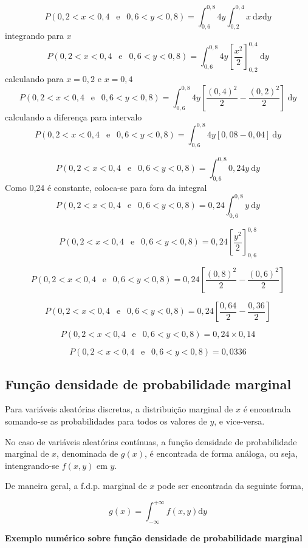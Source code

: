 \documentclass[
]{book}
\begin{document}
\[
  P(0,2 < x < 0,4~~\text{ e }~~0,6 < y < 0,8) = \int_{0,6}^{0,8}4y\int_{0,2}^{0,4}x~\text{d}x \text{d}y
\]
integrando para \(x\)
\[
  P(0,2 < x < 0,4~~\text{ e }~~0,6 < y < 0,8) = \int_{0,6}^{0,8}4y\left[\dfrac{x^2}{2} \right]_{0,2}^{0,4}~\text{d}y
\]
calculando para \(x=0,2\) e \(x=0,4\)
\[
  P(0,2 < x < 0,4~~\text{ e }~~0,6 < y < 0,8) = \int_{0,6}^{0,8}4y\left[\dfrac{(0,4)^2}{2} - \dfrac{(0,2)^2}{2} \right]~\text{d}y
\]
calculando a diferença para intervalo
\[
  P(0,2 < x < 0,4~~\text{ e }~~0,6 < y < 0,8) = \int_{0,6}^{0,8}4y\left[0,08 - 0,04 \right]~\text{d}y
\]

\[
  P(0,2 < x < 0,4~~\text{ e }~~0,6 < y < 0,8) = \int_{0,6}^{0,8}0,24y~\text{d}y
\]
Como 0,24 é constante, coloca-se para fora da integral
\[
  P(0,2 < x < 0,4~~\text{ e }~~0,6 < y < 0,8) = 0,24\int_{0,6}^{0,8}y~\text{d}y
\]

\[
  P(0,2 < x < 0,4~~\text{ e }~~0,6 < y < 0,8) = 0,24\left[  \dfrac{y^2}{2}\right]_{0,6}^{0,8}
\]

\[
  P(0,2 < x < 0,4~~\text{ e }~~0,6 < y < 0,8) = 0,24\left[  \dfrac{(0,8)^2}{2} - \dfrac{(0,6)^2}{2}\right]
\]

\[
  P(0,2 < x < 0,4~~\text{ e }~~0,6 < y < 0,8) = 0,24\left[  \dfrac{0,64}{2} - \dfrac{0,36}{2}\right]
\]

\[
  P(0,2 < x < 0,4~~\text{ e }~~0,6 < y < 0,8) = 0,24\times 0,14
\]

\[
  P(0,2 < x < 0,4~~\text{ e }~~0,6 < y < 0,8) = 0,0336
\]

\hypertarget{funuxe7uxe3o-densidade-de-probabilidade-marginal}{%
\subsection{Função densidade de probabilidade marginal}\label{funuxe7uxe3o-densidade-de-probabilidade-marginal}}

Para variáveis aleatórias discretas, a distribuição marginal de \(x\) é encontrada somando-se as probabilidades para todos os valores de \(y\), e vice-versa.

No caso de variáveis aleatórias contínuas, a função densidade de probabilidade marginal de \(x\), denominada de \(g(x)\), é encontrada de forma análoga, ou seja, intengrando-se \(f(x,y)\) em \(y\).

De maneira geral, a f.d.p. marginal de \(x\) pode ser encontrada da seguinte forma,

\[
  g(x) = \int_{-\infty}^{+\infty} f(x,y) \text{d}y
\]

\textbf{Exemplo numérico sobre função densidade de probabilidade marginal}
\end{document}
